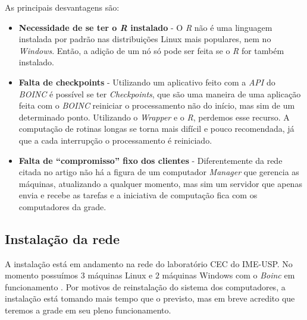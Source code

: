 As principais desvantagens são:

\begin{itemize}
  \item \textbf{Necessidade de se ter o \emph{R} instalado} - O \emph{R} não é uma linguagem instalada por padrão
nas distribuições Linux mais populares, nem no \emph{Windows}. Então, a adição de um nó só pode ser feita se o \emph{R}
for também instalado. 
  \item \textbf{Falta de checkpoints} - Utilizando um aplicativo feito com a \emph{API} do \emph{BOINC} é possível se ter
\emph{Checkpoints}, que são uma maneira de uma aplicação feita com o \emph{BOINC} reiniciar o processamento
não do início, mas sim de um determinado ponto. Utilizando o \emph{Wrapper} e o \emph{R}, perdemos esse recurso. A computação
de rotinas longas se torna mais difícil e pouco recomendada, já que a cada interrupção o processamento é reiniciado. 
  \item \textbf{Falta de ``compromisso'' fixo dos clientes} - Diferentemente da rede citada no artigo %
não há a figura de um computador \emph{Manager} que gerencia as máquinas, atualizando a qualquer momento, mas sim um servidor 
que apenas envia e recebe as tarefas e a iniciativa de computação fica com os computadores da grade. 

\end{itemize}

\subsection{Instalação da rede}

A instalação está em andamento na rede do laboratório CEC do IME-USP. No momento possuímos $3$ máquinas Linux e $2$ máquinas Windows com o \emph{Boinc}
em funcionamento . Por motivos de reinstalação do sistema dos computadores, a instalação está tomando 
mais tempo que o previsto, mas em breve acredito que teremos a grade em seu pleno funcionamento.


